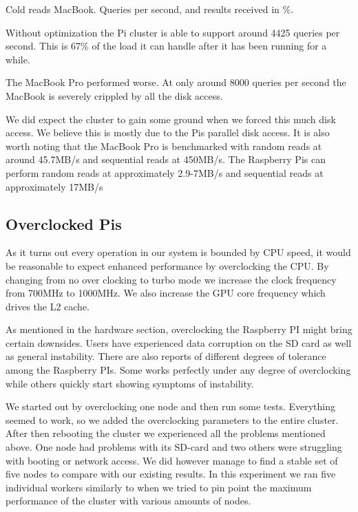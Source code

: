 \begin{table}[h]
	\coldreadmac
	\centering

	\pgfplotstabletypeset[
     	columns={orps, oanswers},
     	every head row/.style={after row=\hline},
		every last row/.style={after row=\hline},
		columns/orps/.style={column name=Queries per second},
		columns/oanswers/.style={column name=received(\%)},
     	]
    {\coldreadmac}
    \caption{Cold reads MacBook. Queries per second, and results received in \%.}
\label{tab:coldread_mac}
\end{table}

Without optimization the Pi cluster is able to support around 4425 queries per second. This is 67\% of the load it can handle after it has been running for a while.

The MacBook Pro performed worse. At only around 8000 queries per second the MacBook is severely crippled by all the disk access.

We did expect the cluster to gain some ground when we forced this much disk access. We believe this is mostly due to the Pis parallel disk access. It is also worth noting that the MacBook Pro is benchmarked with random reads at around 45.7MB/s and sequential reads at 450MB/s. The Raspberry Pis can perform random reads at approximately 2.9-7MB/s and sequential reads at approximately 17MB/s


\subsection{Overclocked Pis}
As it turns out every operation in our system is bounded by CPU speed, it would be reasonable to expect enhanced performance by overclocking the CPU.
By changing from no over clocking to turbo mode we increase the clock frequency from 700MHz to 1000MHz. We also increase the GPU core frequency which drives the L2 cache.

As mentioned in the hardware section, overclocking the Raspberry PI might bring certain downsides. Users have experienced data corruption on the SD card as well as general instability. There are also reports of different degrees of tolerance among the Raspberry PIs. Some works perfectly under any degree of overclocking while others quickly start showing symptoms of instability.

We started out by overclocking one node and then run some tests. Everything seemed to work, so we added the overclocking parameters to the entire cluster. After then rebooting the cluster we experienced all the problems mentioned above. One node had problems with its SD-card and two others were struggling with booting or network access. We did however manage to find a stable set of five nodes to compare with our existing results. In this experiment we ran five individual workers similarly to when we tried to pin point the maximum performance of the cluster with various amounts of nodes.

